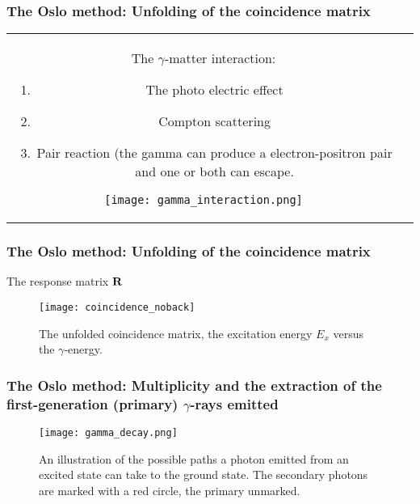 \documentclass{beamer}              %
\begin{document}
\begin{frame}
\frametitle{The Oslo method:
Unfolding of the coincidence matrix}

\begin{tabular}{cc}
\begin{minipage}{0.5\textwidth}
The $\gamma$-matter interaction:
\begin{enumerate}
\item The photo electric effect
\item Compton scattering
\item Pair reaction (the gamma can produce a electron-positron pair and one or both can escape. 
\end{enumerate}
\end{minipage}

\begin{minipage}{0.5\textwidth}
\begin{figure}[htp]
\centering
\texttt{[image: gamma\_interaction.png]}
\label{fig: gamma_interaction}
\end{figure}
\end{minipage}

\end{tabular}
\end{frame}

\begin{frame}
\frametitle{The Oslo method: Unfolding of the coincidence matrix}
The response matrix $\bf R$
\begin{figure}[htp]
\centering
\texttt{[image: coincidence\_noback]}
\caption{The unfolded coincidence matrix, the excitation energy $E_x$ versus the $\gamma$-energy.}
\label{fig: un_coincidence}
\end{figure}
\end{frame}

\begin{frame}
\frametitle{The Oslo method: Multiplicity and the extraction of the first-generation (primary) $\gamma$-rays emitted}


\begin{figure}[htp]
\centering
\texttt{[image: gamma\_decay.png]}
\caption{An illustration of the possible paths a photon emitted from an excited state can take to the ground state. The secondary photons are marked with a red circle, the primary unmarked.}
\label{fig: gamma_decay}
\end{figure}
\end{frame}
\end{document}
